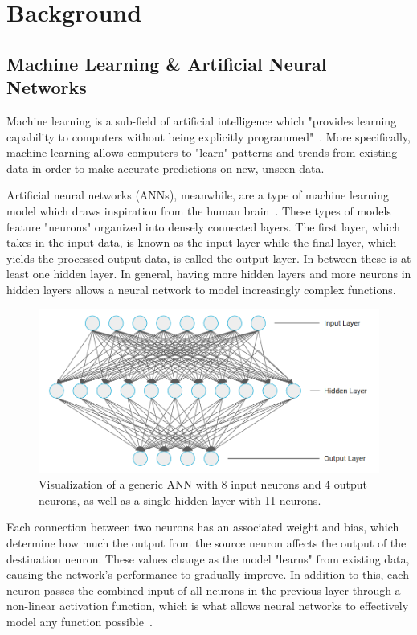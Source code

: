 \section{Background}\label{sec:background}
\subsection{Machine Learning \& Artificial Neural Networks}\label{subsec:machine-learning-and-neural-networks}
Machine learning is a sub-field of artificial intelligence which "provides learning capability to computers
without being explicitly programmed"~\cite{Alzubi_2018}.
More specifically, machine learning allows computers to "learn" patterns and trends from existing data in order to make accurate predictions on new, unseen data.

Artificial neural networks (ANNs), meanwhile, are a type of machine learning model which draws inspiration from the human brain~\cite{Wang2003}.
These types of models feature "neurons" organized into densely connected layers.
The first layer, which takes in the input data, is known as the input layer while the final layer, which yields the processed output data, is called the output layer.
In between these is at least one hidden layer.
In general, having more hidden layers and more neurons in hidden layers allows a neural network to model increasingly complex functions.

\begin{figure}[h]
    \centering
    \captionsetup{justification=centering}
    \includegraphics[width=\linewidth]{figures/ann}
    \caption{Visualization of a generic ANN with 8 input neurons and 4 output neurons, as well as a single hidden layer with 11 neurons.}
    \label{fig:ann}
\end{figure}

Each connection between two neurons has an associated weight and bias, which determine how much the output from the source neuron affects the output of the destination neuron.
These values change as the model "learns" from existing data, causing the network's performance to gradually improve.
In addition to this, each neuron passes the combined input of all neurons in the previous layer through a non-linear activation function, which is what allows neural networks to effectively model any function possible~\cite{Wang2003}.

